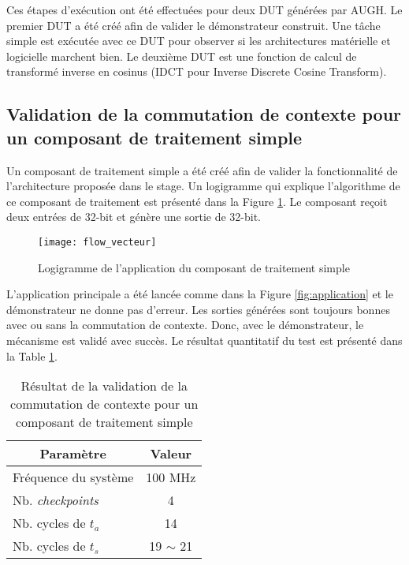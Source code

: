 Ces étapes d'exécution ont été effectuées pour deux DUT générées par AUGH. Le premier DUT a été créé
afin de valider le démonstrateur construit. Une tâche simple est exécutée avec ce DUT pour observer
si les architectures matérielle et logicielle marchent bien. Le deuxième DUT est une fonction de calcul
de transformé inverse en cosinus (IDCT pour Inverse Discrete Cosine Transform).

\subsection{Validation de la commutation de contexte pour un composant de traitement simple}

Un composant de traitement simple a été créé afin de valider la fonctionnalité de 
l'architecture proposée dans le stage. Un logigramme qui explique l'algorithme de ce composant de traitement est présenté dans la Figure
\ref{fig:flow_vecteur}. Le composant reçoit deux entrées de 32-bit et génère une sortie de 32-bit.

\begin{figure}[h]
	\centering
	\texttt{[image: flow\_vecteur]}
	\caption{Logigramme de l'application du composant de traitement simple}
	\label{fig:flow_vecteur}
	\vspace{-2mm}
\end{figure}

L'application principale a été lancée comme dans la Figure \ref{fig:application} et le démonstrateur ne donne pas
d'erreur. Les sorties générées sont toujours bonnes avec ou sans la commutation de contexte. Donc, avec le
démonstrateur, le mécanisme est validé avec succès.
Le résultat quantitatif du test est présenté dans la Table \ref{table:result1}.

\begin{table}[h]
	\caption{Résultat de la validation de la commutation de contexte pour un composant de traitement simple}
 	\label{table:result1}
	\vspace{-2mm}
	\begin{center}
		\begin{tabular}{|l|c|}
			\hline
			\multicolumn{1}{|c|}{\cellcolor{black!30} \textbf{Paramètre}}   				& 	\multicolumn{1}{c|}{\cellcolor{black!30} \textbf{Valeur}} 	\\
			\hline
			Fréquence du système	&	100 MHz	\\
			Nb. \emph{checkpoints}	&	4 		\\
			Nb. cycles de $t_a$		&	14		\\
			Nb. cycles de $t_s$		&	19 $\sim$ 21 \\
			\hline
		\end{tabular}
	\end{center}
	\vspace{-5mm}
\end{table}

